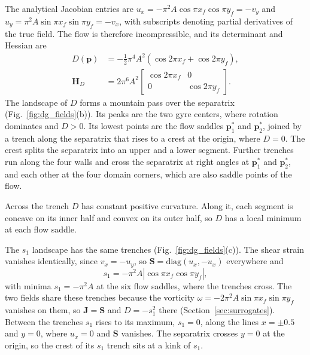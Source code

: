 \documentclass[lettersize,journal]{IEEEtran}
\begin{document}
The analytical Jacobian entries are
$u_x = -\pi^2 A \cos\pi x_f \cos\pi y_f = -v_y$ and
$u_y = \pi^2 A \sin\pi x_f \sin\pi y_f = -v_x$, with subscripts denoting
partial derivatives of the true field. The flow is therefore
incompressible, and its determinant and Hessian are
\begin{equation}
\begin{aligned}
D(\mathbf{p}) &= -\tfrac{1}{2}\pi^4 A^2 \left(\cos 2\pi x_f + \cos 2\pi y_f\right),\\
\mathbf{H}_D &= 2\pi^6 A^2
\begin{bmatrix} \cos 2\pi x_f & 0 \\ 0 & \cos 2\pi y_f \end{bmatrix}.
\end{aligned}
\label{eq:det_analytic_main}
\end{equation}
The landscape of $D$ forms a mountain pass over the separatrix
(Fig.~\ref{fig:dg_fields}(b)). Its peaks are the two gyre centers, where
rotation dominates and $D > 0$. Its lowest points are the flow saddles
$\mathbf{p}_1^*$ and $\mathbf{p}_2^*$, joined by a trench along the
separatrix that rises to a crest at the origin, where $D = 0$. The crest
splits the separatrix into an upper and a lower segment. Further trenches
run along the four walls and cross the separatrix at right angles at
$\mathbf{p}_1^*$ and $\mathbf{p}_2^*$, and each other at the four domain
corners, which are also saddle points of the flow.

Across the trench $D$ has constant positive curvature. Along it, each
segment is concave on its inner half and convex on its outer half, so $D$
has a local minimum at each flow saddle.

The $s_1$ landscape has the same trenches (Fig.~\ref{fig:dg_fields}(c)).
The shear strain vanishes identically, since $v_x = -u_y$, so
$\mathbf{S} = \mathrm{diag}(u_x, -u_x)$ everywhere and
\begin{equation}
s_1 = -\pi^2 A \left|\cos\pi x_f \cos\pi y_f\right|,
\label{eq:s1_analytic_main}
\end{equation}
with minima $s_1 = -\pi^2 A$ at the six flow saddles, where the trenches
cross. The two fields share these trenches because the vorticity
$\omega = -2\pi^2 A \sin\pi x_f \sin\pi y_f$ vanishes on them, so
$\mathbf{J} = \mathbf{S}$ and $D = -s_1^2$ there
(Section~\ref{sec:surrogates}). Between the trenches $s_1$ rises to its
maximum, $s_1 = 0$, along the lines $x = \pm 0.5$ and $y = 0$, where
$u_x = 0$ and $\mathbf{S}$ vanishes. The separatrix crosses $y = 0$
at the origin, so the crest of its $s_1$ trench sits at a kink of $s_1$.
\end{document}
